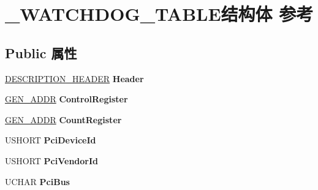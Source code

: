 \hypertarget{struct___w_a_t_c_h_d_o_g___t_a_b_l_e}{}\section{\+\_\+\+W\+A\+T\+C\+H\+D\+O\+G\+\_\+\+T\+A\+B\+L\+E结构体 参考}
\label{struct___w_a_t_c_h_d_o_g___t_a_b_l_e}
\subsection*{Public 属性}
\begin{DoxyCompactItemize}
\item 
\mbox{\label{struct___w_a_t_c_h_d_o_g___t_a_b_l_e_ab50901728d5e6661187440a3c6a22ca1}} 
\hyperlink{struct___d_e_s_c_r_i_p_t_i_o_n___h_e_a_d_e_r}{D\+E\+S\+C\+R\+I\+P\+T\+I\+O\+N\+\_\+\+H\+E\+A\+D\+ER} {\bfseries Header}
\item 
\mbox{\label{struct___w_a_t_c_h_d_o_g___t_a_b_l_e_aef892c13e58a41ca6d791d1e63e1e61d}} 
\hyperlink{struct___g_e_n___a_d_d_r}{G\+E\+N\+\_\+\+A\+D\+DR} {\bfseries Control\+Register}
\item 
\mbox{\label{struct___w_a_t_c_h_d_o_g___t_a_b_l_e_ad910ab0aaff0630de769ef7be2f512c5}} 
\hyperlink{struct___g_e_n___a_d_d_r}{G\+E\+N\+\_\+\+A\+D\+DR} {\bfseries Count\+Register}
\item 
\mbox{\label{struct___w_a_t_c_h_d_o_g___t_a_b_l_e_a74e6f671eecb43dbc115fde0777ac04a}} 
U\+S\+H\+O\+RT {\bfseries Pci\+Device\+Id}
\item 
\mbox{\label{struct___w_a_t_c_h_d_o_g___t_a_b_l_e_acde96ce6d4f2479afc7d2d6852329637}} 
U\+S\+H\+O\+RT {\bfseries Pci\+Vendor\+Id}
\item 
\mbox{\label{struct___w_a_t_c_h_d_o_g___t_a_b_l_e_a8e991c558622c12d148d9316398cd012}} 
U\+C\+H\+AR {\bfseries Pci\+Bus}
\item 
\mbox{\label{struct___w_a_t_c_h_d_o_g___t_a_b_l_e_a83819f7e170896ec8352def0313f1d95}} 

\end{DoxyCompactItemize}
